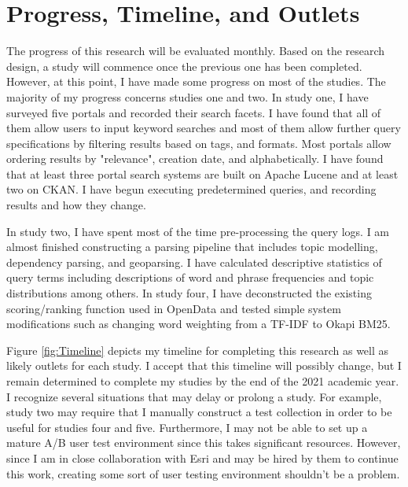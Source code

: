 \chapter{Progress, Timeline, and Outlets} \label{ch:[chapter 8 label]}

The progress of this research will be evaluated monthly. Based on the research design, a study will commence once the previous one has been completed. However, at this point, I have made some progress on most of the studies. The majority of my progress concerns studies one and two. In study one, I have surveyed five portals and recorded their search facets. I have found that all of them allow users to input keyword searches and most of them allow further query specifications by filtering results based on tags, and formats. Most portals allow ordering results by "relevance", creation date, and alphabetically. I have found that at least three portal search systems are built on Apache Lucene and at least two on CKAN. I have begun executing predetermined queries, and recording results and how they change.

In study two, I have spent most of the time pre-processing the query logs. I am almost finished constructing a parsing pipeline that includes topic modelling, dependency parsing, and geoparsing. I have calculated descriptive statistics of query terms including descriptions of word and phrase frequencies and topic distributions among others. In study four, I have deconstructed the existing scoring/ranking function used in OpenData and tested simple system modifications such as changing word weighting from a TF-IDF to Okapi BM25.



Figure \ref{fig:Timeline} depicts my timeline for completing this research as well as likely outlets for each study. I accept that this timeline will possibly change, but I remain determined to complete my studies by the end of the 2021 academic year. I recognize several situations that may delay or prolong a study. For example, study two may require that I manually construct a test collection in order to be useful for studies four and five. Furthermore, I may not be able to set up a mature A/B user test environment since this takes significant resources. However, since I am in close collaboration with Esri and may be hired by them to continue this work, creating some sort of user testing environment shouldn't be a problem.

